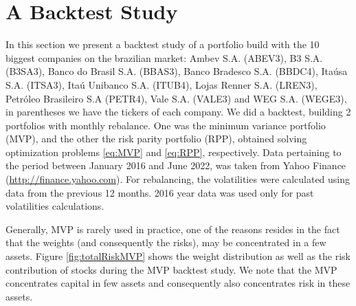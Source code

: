 \section{A Backtest Study}

In this section we present a backtest study of a portfolio build with the 10 biggest companies on the brazilian market: Ambev S.A. (ABEV3), B3 S.A. (B3SA3), Banco do Brasil S.A. (BBAS3), Banco Bradesco S.A. (BBDC4), Itaúsa S.A. (ITSA3), Itaú Unibanco S.A. (ITUB4), Lojas Renner S.A. (LREN3), Petróleo Brasileiro S.A (PETR4), Vale S.A. (VALE3) and WEG S.A. (WEGE3), in parentheses we have the tickers of each company.  We did a backtest, building 2 portfolios with monthly rebalance. One was the minimum variance portfolio (MVP), and the other the risk parity portfolio (RPP),  obtained solving optimization problems \eqref{eq:MVP} and \eqref{eq:RPP}, respectively. Data pertaining to the period between January 2016  and June 2022, was taken from Yahoo Finance (\url{http://finance.yahoo.com}). For rebalancing, the volatilities were calculated using data from the previous 12 months. 2016 year data was used only for past volatilities calculations.

Generally, MVP is rarely used in practice, one of the reasons resides in the fact that the weights (and consequently the risks), may be concentrated in a few assets. Figure \ref{fig:totalRiskMVP} shows the weight distribution as well as the risk contribution of stocks during the MVP backtest study. We note that the MVP concentrates capital in few assets and consequently also concentrates risk in these assets.



